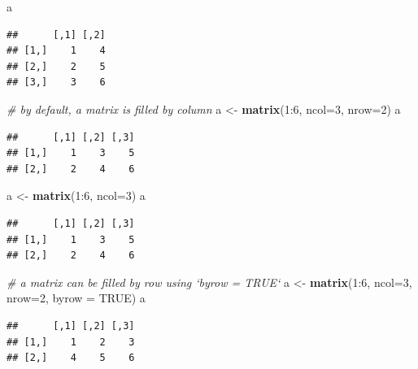 \documentclass[]{book}
\newenvironment{Shaded}{\begin{snugshade}}{\end{snugshade}}
\newcommand{\KeywordTok}[1]{\textcolor[rgb]{0.13,0.29,0.53}{\textbf{{#1}}}}
\newcommand{\DataTypeTok}[1]{\textcolor[rgb]{0.13,0.29,0.53}{{#1}}}
\newcommand{\DecValTok}[1]{\textcolor[rgb]{0.00,0.00,0.81}{{#1}}}
\newcommand{\StringTok}[1]{\textcolor[rgb]{0.31,0.60,0.02}{{#1}}}
\newcommand{\CommentTok}[1]{\textcolor[rgb]{0.56,0.35,0.01}{\textit{{#1}}}}
\newcommand{\OtherTok}[1]{\textcolor[rgb]{0.56,0.35,0.01}{{#1}}}
\newcommand{\NormalTok}[1]{{#1}}
\begin{document}
\begin{Shaded}
\begin{Highlighting}[]
\NormalTok{a}
\end{Highlighting}
\end{Shaded}

\begin{verbatim}
##      [,1] [,2]
## [1,]    1    4
## [2,]    2    5
## [3,]    3    6
\end{verbatim}

\begin{Shaded}
\begin{Highlighting}[]
\CommentTok{# by default, a matrix is filled by column}
\NormalTok{a <-}\StringTok{ }\KeywordTok{matrix}\NormalTok{(}\DecValTok{1}\NormalTok{:}\DecValTok{6}\NormalTok{, }\DataTypeTok{ncol=}\DecValTok{3}\NormalTok{, }\DataTypeTok{nrow=}\DecValTok{2}\NormalTok{)}
\NormalTok{a}
\end{Highlighting}
\end{Shaded}

\begin{verbatim}
##      [,1] [,2] [,3]
## [1,]    1    3    5
## [2,]    2    4    6
\end{verbatim}

\begin{Shaded}
\begin{Highlighting}[]
\NormalTok{a <-}\StringTok{ }\KeywordTok{matrix}\NormalTok{(}\DecValTok{1}\NormalTok{:}\DecValTok{6}\NormalTok{, }\DataTypeTok{ncol=}\DecValTok{3}\NormalTok{)}
\NormalTok{a}
\end{Highlighting}
\end{Shaded}

\begin{verbatim}
##      [,1] [,2] [,3]
## [1,]    1    3    5
## [2,]    2    4    6
\end{verbatim}

\begin{Shaded}
\begin{Highlighting}[]
\CommentTok{# a matrix can be filled by row using `byrow = TRUE`}
\NormalTok{a <-}\StringTok{ }\KeywordTok{matrix}\NormalTok{(}\DecValTok{1}\NormalTok{:}\DecValTok{6}\NormalTok{, }\DataTypeTok{ncol=}\DecValTok{3}\NormalTok{, }\DataTypeTok{nrow=}\DecValTok{2}\NormalTok{, }\DataTypeTok{byrow =} \OtherTok{TRUE}\NormalTok{)}
\NormalTok{a}
\end{Highlighting}
\end{Shaded}

\begin{verbatim}
##      [,1] [,2] [,3]
## [1,]    1    2    3
## [2,]    4    5    6
\end{verbatim}
\end{document}
